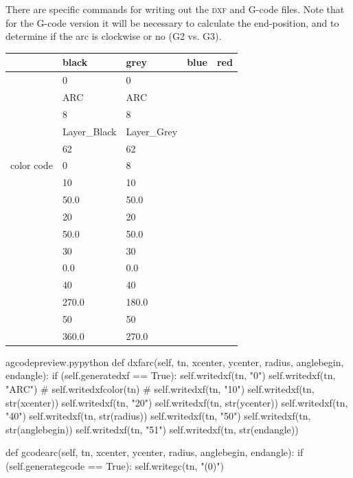 \documentclass{ltxdoc}
\begin{document}
There are specific commands for writing out the \textsc{dxf} and G-code files. Note that for the G-code version it will be necessary to calculate the end-position, and to determine if the arc is clockwise or no (G2 vs. G3).

\begin{center}
\noindent\begin{tabular}{lllll}
           & black & grey & blue & red \\
\toprule
& 0            & 0 \\
& ARC          & ARC \\ 
& 8            & 8 \\
& Layer\_Black & Layer\_Grey\\
& 62           & 62 \\
color code & 0            & 8 \\
& 10           & 10 \\
& 50.0         & 50.0 \\
& 20           & 20 \\
& 50.0         & 50.0 \\
& 30           & 30 \\
& 0.0          & 0.0 \\
& 40           & 40 \\
& 270.0        & 180.0 \\
& 50           & 50 \\
& 360.0        & 270.0\\\bottomrule
\end{tabular}
\end{center}

\lstset{firstnumber=\thegcpy}
\begin{writecode}{a}{gcodepreview.py}{python}
    def dxfarc(self, tn, xcenter, ycenter, radius, anglebegin, endangle):
        if (self.generatedxf == True):
            self.writedxf(tn, "0")
            self.writedxf(tn, "ARC")
#
            self.writedxfcolor(tn)
#
            self.writedxf(tn, "10")
            self.writedxf(tn, str(xcenter))
            self.writedxf(tn, "20")
            self.writedxf(tn, str(ycenter))
            self.writedxf(tn, "40")
            self.writedxf(tn, str(radius))
            self.writedxf(tn, "50")
            self.writedxf(tn, str(anglebegin))
            self.writedxf(tn, "51")
            self.writedxf(tn, str(endangle))

    def gcodearc(self, tn, xcenter, ycenter, radius, anglebegin, endangle):
        if (self.generategcode == True):
            self.writegc(tn, "(0)")

\end{writecode}
\addtocounter{gcpy}{19}
\end{document}
